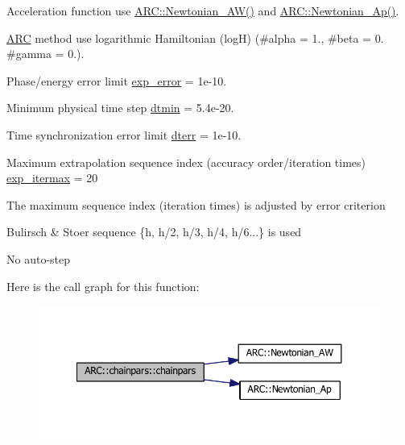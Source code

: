 \begin{DoxyItemize}
\item Acceleration function use \hyperlink{namespaceARC_ab9fc6518902e918927d8c6bd3d51401d}{A\+R\+C\+::\+Newtonian\+\_\+\+A\+W()} and \hyperlink{namespaceARC_a70d2d18fc72d05606cb2c991ada4c64b}{A\+R\+C\+::\+Newtonian\+\_\+\+Ap()}.
\item \hyperlink{namespaceARC}{A\+RC} method use logarithmic Hamiltonian (logH) (\#alpha = 1., \#beta = 0. \#gamma = 0.).
\item Phase/energy error limit \hyperlink{classARC_1_1chainpars_a7ee477ebe8b1d67457891ab58560c074}{exp\+\_\+error} = 1e-\/10.
\item Minimum physical time step \hyperlink{classARC_1_1chainpars_ac414014d19915aecb35245ba11649c2e}{dtmin} = 5.\+4e-\/20.
\item Time synchronization error limit \hyperlink{classARC_1_1chainpars_ad3a3e8f9199180ec82b9c257b1e8570e}{dterr} = 1e-\/10.
\item Maximum extrapolation sequence index (accuracy order/iteration times) \hyperlink{classARC_1_1chainpars_a91a648cc6e52054cecad54a29dc5e9a1}{exp\+\_\+itermax} = 20
\item The maximum sequence index (iteration times) is adjusted by error criterion
\item Bulirsch \& Stoer sequence \{h, h/2, h/3, h/4, h/6...\} is used
\item No auto-\/step 
\end{DoxyItemize}Here is the call graph for this function\+:
\nopagebreak
\begin{figure}[H]
\begin{center}
\leavevmode
\includegraphics[width=350pt]{classARC_1_1chainpars_a2019a609d85e2b801f306ac8c7f268ab_cgraph}
\end{center}
\end{figure}
\hypertarget{classARC_1_1chainpars_a02898688da2b01ee9db51066ee5e4111}{}\label{classARC_1_1chainpars_a02898688da2b01ee9db51066ee5e4111} 
